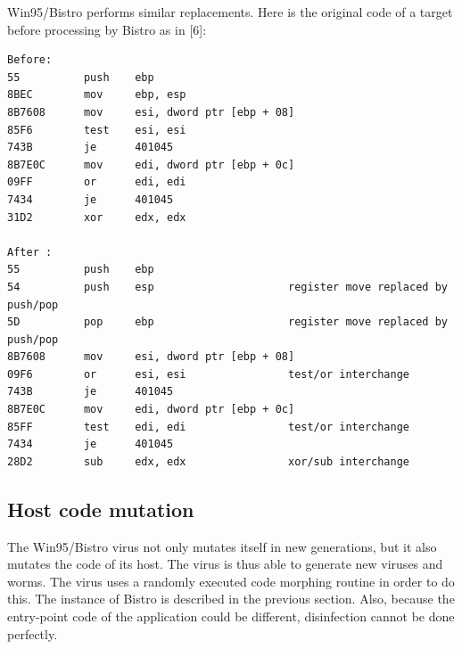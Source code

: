 Win95/Bistro performs similar replacements. Here is the original code of a target before processing by Bistro as in [6]: 
\begin{verbatim}
Before:
55          push    ebp
8BEC        mov     ebp, esp
8B7608      mov     esi, dword ptr [ebp + 08]
85F6        test    esi, esi
743B        je      401045
8B7E0C      mov     edi, dword ptr [ebp + 0c]
09FF        or      edi, edi
7434        je      401045
31D2        xor     edx, edx

After :
55          push    ebp
54          push    esp			            register move replaced by push/pop
5D          pop     ebp			            register move replaced by push/pop
8B7608      mov     esi, dword ptr [ebp + 08] 
09F6        or      esi, esi			    test/or interchange
743B        je      401045
8B7E0C      mov     edi, dword ptr [ebp + 0c]
85FF        test    edi, edi			    test/or interchange
7434        je      401045
28D2        sub     edx, edx	            xor/sub interchange
\end{verbatim}

\subsection{Host code mutation}
The Win95/Bistro virus not only mutates itself in new generations, but it also mutates the code of its host. The virus is thus able to generate new viruses and worms. The virus uses a randomly executed code morphing routine in order to do this. The instance of Bistro is described in the previous section. Also, because the entry-point code of the application could be different, disinfection cannot be done perfectly. 
